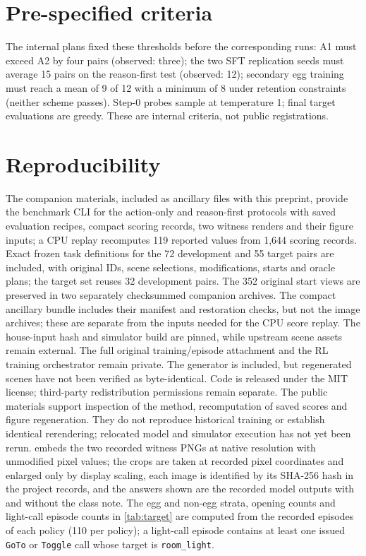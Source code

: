 \documentclass{article}
\begin{document}
\section{Pre-specified criteria}
The internal plans fixed these thresholds before the corresponding runs: A1 must exceed A2 by four pairs (observed: three); the two SFT replication seeds must average 15 pairs on the reason-first test (observed: 12); secondary egg training must reach a mean of 9 of 12 with a minimum of 8 under retention constraints (neither scheme passes). Step-0 probes sample at temperature 1; final target evaluations are greedy. These are internal criteria, not public registrations.

\section{Reproducibility}
\label{app:repro}
The companion materials, included as ancillary files with this preprint, provide the benchmark CLI for the action-only and reason-first protocols with saved evaluation recipes, compact scoring records, two witness renders and their figure inputs; a CPU replay recomputes 119 reported values from 1,644 scoring records. Exact frozen task definitions for the 72 development and 55 target pairs are included, with original IDs, scene selections, modifications, starts and oracle plans; the target set reuses 32 development pairs. The 352 original start views are preserved in two separately checksummed companion archives. The compact ancillary bundle includes their manifest and restoration checks, but not the image archives; these are separate from the inputs needed for the CPU score replay. The house-input hash and simulator build are pinned, while upstream scene assets remain external. The full original training/episode attachment and the RL training orchestrator remain private. The generator is included, but regenerated scenes have not been verified as byte-identical. Code is released under the MIT license; third-party redistribution permissions remain separate. The public materials support inspection of the method, recomputation of saved scores and figure regeneration. They do not reproduce historical training or establish identical rerendering; relocated model and simulator execution has not yet been rerun.  embeds the two recorded witness PNGs at native resolution with unmodified pixel values; the crops are taken at recorded pixel coordinates and enlarged only by display scaling, each image is identified by its SHA-256 hash in the project records, and the answers shown are the recorded model outputs with and without the class note. The egg and non-egg strata, opening counts and light-call episode counts in \cref{tab:target} are computed from the recorded episodes of each policy (110 per policy); a light-call episode contains at least one issued \texttt{GoTo} or \texttt{Toggle} call whose target is \texttt{room\_light}.
\end{document}
